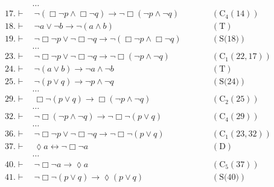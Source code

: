 \documentclass[a4paper, 12pt]{report}
\begin{document}
{{            \begin{equation*}
                \begin{alignedat}{2}
                    & \ldots && \\
                    17. \vdash & \ \lnot (\Box \lnot p \land \Box \lnot q) \to \lnot \Box (\lnot p \land \lnot q) && \quad \quad (\mbox{C}_4(14)) \\
                    18. \vdash & \ \lnot a \lor \lnot b \to \lnot (a \land b) && \quad \quad (\mbox{T}) \\
                    19. \vdash & \ \lnot \Box \lnot p \lor \lnot \Box \lnot q \to \lnot (\Box \lnot p \land \Box \lnot q) && \quad \quad (\mbox{S(18)}) \\
                               & \ldots && \\
                    23. \vdash & \ \lnot \Box \lnot p \lor \lnot \Box \lnot q \to \lnot \Box (\lnot p \land \lnot q) && \quad \quad (\mbox{C}_1(22, 17)) \\
                    24. \vdash & \ \lnot (a \lor b) \to \lnot a \land \lnot b && \quad \quad (\mbox{T}) \\
                    25. \vdash & \ \lnot (p \lor q) \to \lnot p \land \lnot q && \quad \quad (\mbox{S(24)}) \\
                               & \ldots && \\
                    29. \vdash & \ \Box \lnot (p \lor q) \to \Box (\lnot p \land \lnot q) && \quad \quad (\mbox{C}_2(25)) \\
                               & \ldots && \\
                    32. \vdash & \ \lnot \Box (\lnot p \land \lnot q) \to \lnot \Box \lnot (p \lor q) && \quad \quad (\mbox{C}_4(29)) \\
                               & \ldots && \\
                    36. \vdash & \ \lnot \Box \lnot p \lor \lnot \Box \lnot q \to \lnot \Box \lnot (p \lor q) && \quad \quad (\mbox{C}_1(23, 32)) \\
                    37. \vdash & \ \lozenge a \leftrightarrow \lnot \Box \lnot a && \quad \quad (\mbox{D}) \\
                               & \ldots && \\
                    40. \vdash & \ \lnot \Box \lnot a \to \lozenge a && \quad \quad (\mbox{C}_5(37)) \\
                    41. \vdash & \ \lnot \Box \lnot (p \lor q) \to \lozenge (p \lor q) && \quad \quad (\mbox{S(40)}) \\

\end{alignedat}
\end{equation*}}}
\end{document}
